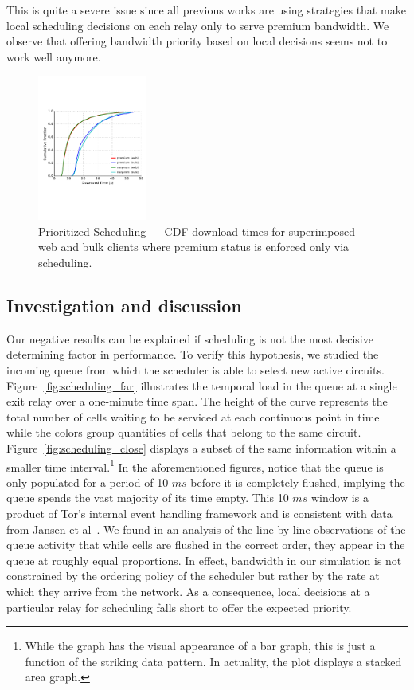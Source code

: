 This is quite a severe issue since all previous works are using strategies that
make local scheduling decisions on each relay only to serve premium bandwidth.
We observe that offering bandwidth priority based on local decisions seems not
to work well anymore.

\begin{figure} \centering
  \includegraphics[trim={0 3cm 0 3cm}, clip, width=0.32\textwidth]{images/scheduling_priority.pdf}
  \caption[Prioritized Scheduling]{Prioritized Scheduling --- CDF download
    times for superimposed web and bulk clients where premium status is enforced
    only via scheduling.}
  \label{fig:scheduling_priority}
\end{figure}

\subsection{Investigation and discussion}

Our negative results can be explained if scheduling is not the most decisive
determining factor in performance. To verify this hypothesis, we studied the
incoming queue from which the scheduler is able to select new active
circuits. Figure~\ref{fig:scheduling_far} illustrates the temporal load in the
queue at a single exit relay over a one-minute time span. The height of the
curve represents the total number of cells waiting to be serviced at each
continuous point in time while the colors group quantities of cells that belong
to the same circuit. Figure~\ref{fig:scheduling_close} displays a subset of the
same information within a smaller time interval.\footnote{While the graph has
  the visual appearance of a bar graph, this is just a function of the striking
  data pattern. In actuality, the plot displays a stacked area graph.} In the
aforementioned figures, notice that the queue is only populated for a period of
10 $ms$ before it is completely flushed, implying the queue spends the vast
majority of its time empty. This 10 $ms$ window is a product of Tor's internal
event handling framework and is consistent with data from Jansen et
al~\cite{jansen2017tor}. We found in an analysis of the line-by-line
observations of the queue activity that while cells are flushed in the correct
order, they appear in the queue at roughly equal proportions. In effect,
bandwidth in our simulation is not constrained by the ordering policy of the
scheduler but rather by the rate at which they arrive from the network. As a
consequence, local decisions at a particular relay for scheduling falls short
to offer the expected priority.


